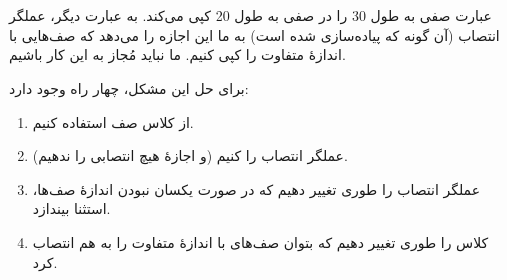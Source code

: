 \section{}
\paragraph{}\label{answer:14}
عبارت  صفی به طول 30 را در صفی به طول 20 کپی می‌کند. به عبارت دیگر، عملگر انتصاب (آن گونه که پیاده‌سازی شده است) به ما این اجازه را می‌دهد که صف‌هایی با اندازهٔ متفاوت را کپی کنیم. ما نباید مُجاز به این کار باشیم.

برای حل این مشکل، چهار راه وجود دارد:
\begin{enumerate}
    \item از کلاس صف  استفاده کنیم.
    \item عملگر انتصاب را  کنیم (و اجازهٔ هیچ انتصابی را ندهیم).
    \item عملگر انتصاب را طوری تغییر دهیم که در صورت یکسان نبودن اندازهٔ صف‌ها، استثنا بیندازد.
    \item کلاس  را طوری تغییر دهیم که بتوان صف‌های با اندازهٔ متفاوت را به هم انتصاب کرد.
\end{enumerate}

